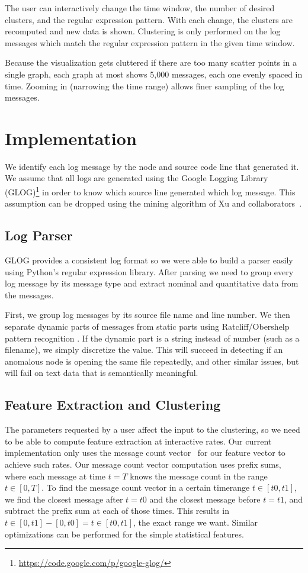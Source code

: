 \documentclass[conference]{style/acmsiggraph}
\begin{document}
The user can interactively change the time window, the number of desired clusters, and the regular expression pattern. With each change, the clusters are recomputed and new data is shown. Clustering is only performed on the log messages which match the regular expression pattern in the given time window.

Because the visualization gets cluttered if there are too many scatter points in a single graph, each graph at most shows 5,000 messages, each one evenly spaced in time.
Zooming in (narrowing the time range) allows finer sampling of the log messages.


\section{Implementation}
We identify each log message by the node and source code line that generated it.
We assume that all logs are generated using the Google Logging Library (GLOG)\footnote{\url{https://code.google.com/p/google-glog/}} in order to know which source line generated which log message.
This assumption can be dropped using the mining algorithm of Xu and collaborators~\cite{Xu:2009:OSP:1674659.1677125}.

\subsection{Log Parser}
GLOG provides a consistent log format so we were able to build a parser easily using Python's regular expression
library. After parsing we need to group every log message by its message type and extract nominal and
quantitative data from the messages.

First, we group log messages by its source file name and line number.
We then separate dynamic parts of messages from static parts using Ratcliff/Obershelp pattern recognition \cite{pattermatch}.
If the dynamic part is a string instead of number (such as a filename), we simply discretize the value.
This will succeed in detecting if an anomalous node is opening the same file repeatedly, and other similar issues, but will fail on text data that is semantically meaningful.

\subsection{Feature Extraction and Clustering}
The parameters requested by a user affect the input to the clustering, so we need to be able to compute feature extraction at interactive rates.
Our current implementation only uses the message count vector~\cite{Xu09} for our feature vector to achieve such rates.
Our message count vector computation uses prefix sums, where each message at time $t=T$ knows the message count in the range $t \in [0, T]$.
To find the message count vector in a certain timerange $t \in [t0, t1]$, we find the closest message after $t=t0$ and the closest message before $t=t1$, and subtract the prefix sum at each of those times.
This results in $t \in [0,t1] - [0,t0] = t \in [t0,t1]$, the exact range we want.
Similar optimizations can be performed for the simple statistical features.
\end{document}

